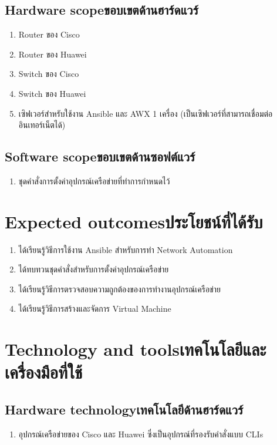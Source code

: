 \subsection{\ifenglish Hardware scope\else ขอบเขตด้านฮาร์ดแวร์\fi}
\begin{enumerate}
    \item {Router ของ Cisco}
    \item {Router ของ Huawei}
    \item {Switch ของ Cisco}
    \item {Switch ของ Huawei}
    \item {เซิฟเวอร์สำหรับใช้งาน Ansible และ AWX 1 เครื่อง (เป็นเซิฟเวอร์ที่สามารถเชื่อมต่ออินเทอร์เน็ตได้)}
\end{enumerate}
\subsection{\ifenglish Software scope\else ขอบเขตด้านซอฟต์แวร์\fi}
\begin{enumerate}
    \item {ชุดคำสั่งการตั้งค่าอุปกรณ์เครือข่ายที่ทำการกำหนดไว้}
\end{enumerate}
\section{\ifenglish Expected outcomes\else ประโยชน์ที่ได้รับ\fi}
\begin{enumerate}
    \item {ได้เรียนรู้วิธีการใช้งาน Ansible สำหรับการทำ Network Automation}
    \item {ได้ทบทวนชุดคำสั่งสำหรับการตั้งค่าอุปกรณ์เครือข่าย}
    \item {ได้เรียนรู้วิธีการตรวจสอบความถูกต้องของการทำงานอุปกรณ์เครือข่าย}
    \item {ได้เรียนรู้วิธีการสร้างและจัดการ Virtual Machine }
\end{enumerate}
\section{\ifenglish Technology and tools\else เทคโนโลยีและเครื่องมือที่ใช้\fi}
    
\subsection{\ifenglish Hardware technology\else เทคโนโลยีด้านฮาร์ดแวร์\fi}
\begin{enumerate}
    \item {อุปกรณ์เครือข่ายของ Cisco และ Huawei ซึ่งเป็นอุปกรณ์ที่รองรับคำสั่งแบบ CLIs}
\end{enumerate}
